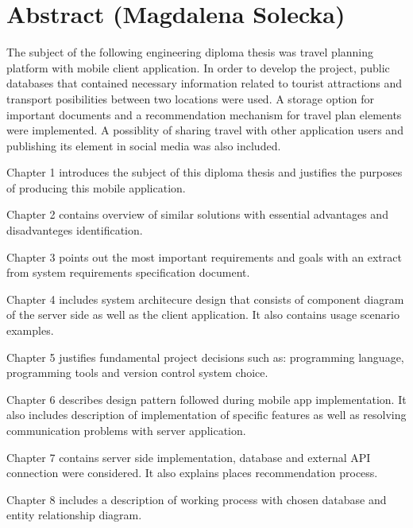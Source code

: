 \chapter*{Abstract (Magdalena Solecka)}
\par The subject of the following engineering diploma thesis was travel planning 
platform with mobile client application. In order to develop the project, public 
databases that contained necessary information related to tourist attractions and 
transport posibilities between two locations were used. A storage option for important 
documents and a recommendation mechanism for travel plan elements were implemented. 
A possiblity of sharing travel with other application users and publishing its element 
in social media was also included.
 
\par Chapter 1 introduces the subject of this diploma thesis and justifies the purposes 
of producing this mobile application. 
 
\par Chapter 2 contains overview of similar solutions with essential advantages and 
disadvanteges identification.

\par Chapter 3 points out the most important requirements and goals with an extract from 
system requirements specification document.

\par Chapter 4 includes system architecure design that consists of component diagram of 
the server side as well as the client application. It also contains usage scenario 
examples.

\par Chapter 5 justifies fundamental project decisions such as: programming language, 
programming tools and version control system choice.

\par Chapter 6 describes design pattern followed during mobile app implementation. It 
also includes description of implementation of specific features as well as resolving 
communication problems with server application.

\par Chapter 7 contains server side implementation, database and external API connection 
were considered. It also explains places recommendation process. 

\par Chapter 8 includes a description of working process with chosen database and entity 
relationship diagram.

